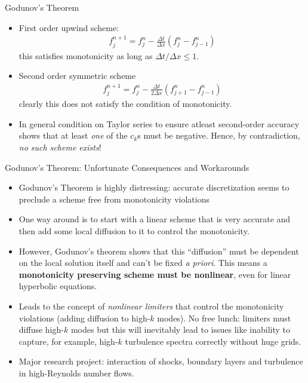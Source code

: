 \documentclass[aspectratio=169]{beamer}
\newcommand{\mypause}{\pause}
\begin{document}
\begin{frame}{Godunov's Theorem}
  \small%
  \begin{itemize}
  \item First order upwind scheme:
    \begin{align*}
      f_j^{n+1} = f_j^n -\frac{\Delta t}{\Delta x}(f_j^n - f_{j-1}^n)
    \end{align*}
    this satisfies monotonicity as long as
    ${\Delta t}/{\Delta x} \le 1$.%
    \mypause%
  \item Second order symmetric scheme
    \begin{align*}
      f_j^{n+1} = f_j^n -\frac{\Delta t}{2 \Delta x}(f_{j+1}^n - f_{j-1}^n)
    \end{align*}
    clearly this does not satisfy the condition of monotonicity.
    \mypause%
  \item In general condition on Taylor series to ensure atleast
    second-order accuracy shows that at least \emph{one} of the $c_k$s
    must be negative. Hence, by contradiction, \emph{no such scheme
      exists}!
  \end{itemize}
\end{frame}

\begin{frame}{Godunov's Theorem: Unfortunate Consequences and Workarounds}
  \small%
  \begin{itemize}
  \item Godunov's Theorem is highly distressing: accurate
    discretization seems to preclude a scheme free from monotonicity
    violations
    \mypause%
  \item One way around is to start with a linear scheme that is very
    accurate and then add some local diffusion to it to control the
    monotonicity.%
    \mypause%
  \item However, Godunov's theorem shows that this ``diffusion'' must
    be dependent on the local solution itself and can't be fixed
    \emph{a priori}. This means a {\bf monotonicity preserving scheme
      must be nonlinear}, even for linear hyperbolic equations.%
    \mypause%
  \item Leads to the concept of \emph{nonlinear limiters} that control
    the monotonicity violations (adding diffusion to high-$k$ modes).
    No free lunch: limiters must diffuse high-$k$ modes but this will
    inevitably lead to issues like inability to capture, for example,
    high-$k$ turbulence spectra correctly without huge grids.
  \item Major research project: interaction of shocks, boundary layers
    and turbulence in high-Reynolds number flows.
  \end{itemize}
\end{frame}
  
\end{document}
